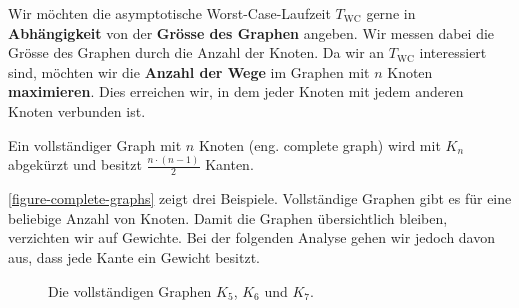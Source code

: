  Wir möchten die asymptotische Worst-Case-Laufzeit $T_{\text{WC}}$ gerne in \textbf{Abhängigkeit} von der \textbf{Grösse des Graphen} angeben. Wir messen dabei die Grösse des Graphen durch die Anzahl der Knoten. Da wir an $T_{\text{WC}}$ interessiert sind, möchten wir die \textbf{Anzahl der Wege} im Graphen mit $n$ Knoten \textbf{maximieren}. Dies erreichen wir, in dem jeder Knoten mit jedem anderen Knoten verbunden ist. 

\begin{definition}
	Ein vollständiger Graph mit $n$ Knoten (eng. complete graph) wird mit $K_n$ abgekürzt und besitzt $\frac{n\cdot(n-1)}{2}$ Kanten.
\end{definition}

\autoref{figure-complete-graphs} zeigt drei Beispiele. Vollständige Graphen gibt es für eine beliebige Anzahl von Knoten. Damit die Graphen übersichtlich bleiben, verzichten wir auf Gewichte. Bei der folgenden Analyse gehen wir jedoch davon aus, dass jede Kante ein Gewicht besitzt.

\begin{figure}[htb]
	\centering
	\begin{minipage}{0.3\textwidth}
	\end{minipage}
	\begin{minipage}{0.3\textwidth}
	\end{minipage}
	\begin{minipage}{0.3\textwidth}
	\end{minipage}
	\caption{Die vollständigen Graphen $K_5$, $K_6$ und $K_7$.}
	\label{figure-complete-graphs}
\end{figure}


